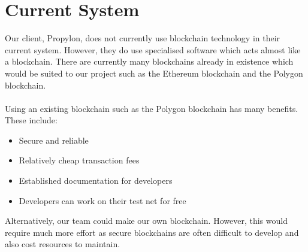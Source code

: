 \section{Current System}
Our client, Propylon, does not currently use blockchain technology in their current system.
However, they do use specialised software which acts almost like a blockchain. 
There are currently many blockchains already in existence which would be suited to our project such as the Ethereum blockchain 
and the Polygon blockchain. \\ \\

\noindent
Using an existing blockchain such as the Polygon blockchain has many benefits. These include: 

\begin{itemize}
    \item Secure and reliable 
    \item Relatively cheap transaction fees 
    \item Established documentation for developers
    \item Developers can work on their test net for free 
\end{itemize}

\noindent
Alternatively, our team could make our own blockchain. 
However, this would require much more effort as secure blockchains are often difficult to develop and also cost resources to maintain. 
